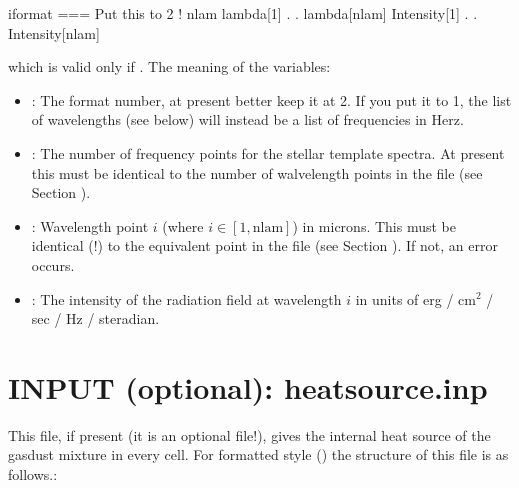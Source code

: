 \documentclass[letterpaper,10pt,english]{sphinxmanual}
\begin{document}
\begin{sphinxVerbatim}[commandchars=\\\{\}]
iformat                           \PYGZlt{}=== Put this to 2 !
nlam
lambda[1]
  .
  .
lambda[nlam]
Intensity[1]
  .
  .
Intensity[nlam]
\end{sphinxVerbatim}

which is valid only if . The meaning of the variables:
\begin{itemize}
\item {} 
: The format number, at present better keep it at 2.
If you put it to 1, the list of wavelengths (see below) will instead be
a list of frequencies in Herz.

\item {} 
: The number of frequency points for the stellar
template spectra. At present this must be identical to the number of
walvelength points in the file  (see
Section {\hyperref[\detokenize{inputoutputfiles:sec-wavelengths}]{}}).

\item {} 
: Wavelength point \(i\) (where \(i\in [1,\mathrm{nlam}]\))
in microns. This must be identical (!) to the
equivalent point in the file  (see
Section {\hyperref[\detokenize{inputoutputfiles:sec-wavelengths}]{}}). If not, an error occurs.

\item {} 
: The intensity of the radiation field at
wavelength \(i\) in units of erg / \(\mathrm{cm}^2\) / sec / Hz / steradian.

\end{itemize}


\section{INPUT (optional): heatsource.inp}
\label{\detokenize{inputoutputfiles:input-optional-heatsource-inp}}\label{\detokenize{inputoutputfiles:sec-heatsource}}
This file, if present (it is an optional file!), gives the internal heat
source of the gas\sphinxhyphen{}dust mixture in every cell. For formatted style
() the structure of this file is as follows.:
\end{document}
